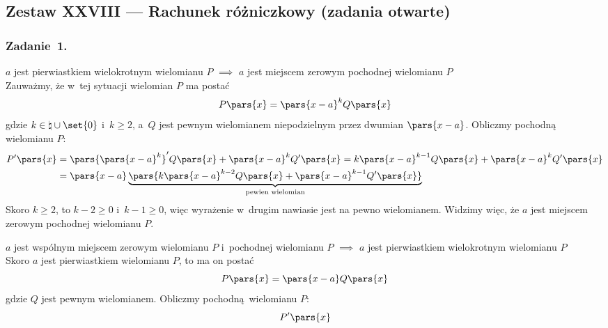 \subsection*{Zestaw XXVIII --- Rachunek różniczkowy (zadania otwarte)}
\subsubsection*{Zadanie~1.}
\begin{proofcases}
    \item \(a\) jest pierwiastkiem wielokrotnym wielomianu \(P\) \(\implies\) \(a\) jest miejscem zerowym pochodnej wielomianu \(P\)\\
        Zauważmy, że w~tej sytuacji wielomian \(P\) ma postać
        \begin{equation*}
            P\pars{x} = \pars{x - a}^kQ\pars{x}
        \end{equation*}
        gdzie \(k \in \natural \cup \set{0}\) i~\(k \geq 2\), a~\(Q\) jest pewnym wielomianem niepodzielnym przez dwumian \(\pars{x - a}\). Obliczmy pochodną wielomianu \(P\):
        \begin{equation*}
            \begin{split}
                P'\pars{x}
                    &= \pars{\pars{x - a}^k}'Q\pars{x} + \pars{x - a}^kQ'\pars{x}
                    = k\pars{x - a}^{k - 1}Q\pars{x} + \pars{x - a}^kQ'\pars{x}\\
                    &= \pars{x - a}\underbrace{\pars{k\pars{x - a}^{k - 2}Q\pars{x} + \pars{x - a}^{k - 1}Q'\pars{x}}}_{\text{pewien wielomian}}
            \end{split}
        \end{equation*}
        Skoro \(k \geq 2\), to \(k - 2 \geq 0\) i~\(k - 1 \geq 0\), więc wyrażenie w~drugim nawiasie jest na pewno wielomianem. Widzimy więc, że \(a\) jest miejscem zerowym pochodnej wielomianu \(P\).
    \item \(a\) jest wspólnym miejscem zerowym wielomianu \(P\) i~pochodnej wielomianu \(P\) \(\implies\) \(a\) jest pierwiastkiem wielokrotnym wielomianu \(P\)\\
        Skoro \(a\) jest pierwiastkiem wielomianu \(P\), to ma on postać
        \begin{equation*}
            P\pars{x} = \pars{x - a}Q\pars{x}
        \end{equation*}
        gdzie \(Q\) jest pewnym wielomianem. Obliczmy pochodną wielomianu \(P\):
        \begin{equation*}
            P'\pars{x}

\end{equation*}
\end{proofcases}
